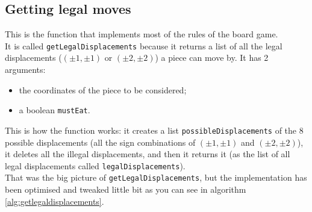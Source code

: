 \documentclass[10pt, a4paper]{article}
\begin{document}
	\subsection{Getting legal moves}
	\label{subsec:gettinglegalmoves}
	This is the function that implements most of the rules of the board game. \\
	It is called \texttt{getLegalDisplacements} because it returns a list of all the legal displacements (\((\pm1, \pm1)\) or \((\pm2, \pm2)\)) a piece can move by. It has 2 arguments:
	\begin{itemize}
		\item the coordinates of the piece to be considered;
		\item a boolean \texttt{mustEat}.
	\end{itemize}
	This is how the function works: it creates a list \texttt{possibleDisplacements} of the 8 possible displacements (all the sign combinations of \((\pm1, \pm1)\) and \((\pm2, \pm2)\)), it deletes all the illegal displacements, and then it returns it (as the list of all legal displacements called \texttt{legalDisplacements}). \\
	That was the big picture of \texttt{getLegalDisplacements}, but the implementation has been optimised and tweaked little bit as you can see in algorithm \ref{alg:getlegaldisplacements}.\\
\end{document}
